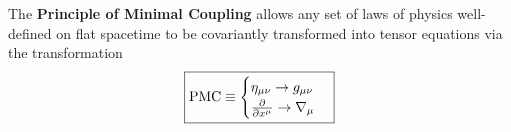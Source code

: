 \documentclass{article}
\begin{document}
 		\begin{defn}
 			The \textbf{Principle of Minimal Coupling} allows any set of laws of physics well-defined on flat spacetime to be covariantly transformed into tensor equations via the transformation
 			\vspace{1.5cm}
 			\begin{equation}
 				\label{eq:PrincipleOfMinimalCoupling}
 				\boxed{ \text{PMC} \equiv \begin{cases}
 						\eta_{\mu\nu} \to g_{\mu\nu} \\
 						\frac{\partial}{\partial x^\mu} \to \nabla_\mu
 				\end{cases}}
 			\end{equation}
 		\end{defn}
 	
 		\pagebreak
 		
\end{document}
